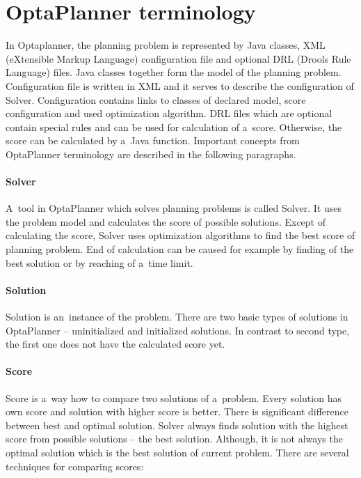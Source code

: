 \section{OptaPlanner terminology}\label{OptaPlannerTerminologySection}
In Optaplanner, the planning problem is represented by Java classes, XML (eXtensible Markup Language) configuration file
and optional DRL (Drools Rule Language) files. Java classes together form the model of the planning problem.
Configuration file is written in XML and it serves to describe the configuration of Solver. Configuration contains
links to classes of declared model, score configuration and used optimization algorithm. DRL files which are optional
contain special rules and can be used for calculation of a~score. Otherwise, the score can be calculated by a~Java
function. Important concepts from OptaPlanner terminology are described in the following paragraphs.

\paragraph{Solver}
A~tool in OptaPlanner which solves planning problems is called Solver. It uses the problem model and calculates the
score of possible solutions. Except of calculating the score, Solver uses optimization algorithms to find the best score
of planning problem. End of calculation can be caused for example by finding of the best solution or by reaching of
a~time limit.

\paragraph{Solution}
Solution is an~instance of the problem. There are two basic types of solutions in OptaPlanner -- uninitialized and
initialized solutions. In contrast to second type, the first one does not have the calculated score yet.

\paragraph{Score}
Score is a~way how to compare two solutions of a~problem. Every solution has own score and solution with higher score is
better. There is significant difference between best and optimal solution. Solver always finds solution with the highest
score from possible solutions -- the best solution. Although, it is not always the optimal solution which is the best
solution of current problem. There are several techniques for comparing scores:


